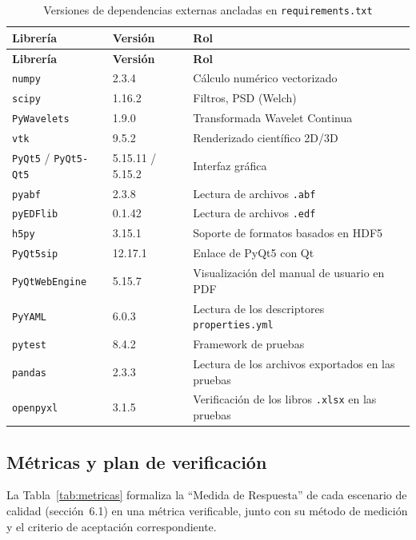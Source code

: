 \documentclass[11pt,a4paper]{article}
\DeclareRobustCommand{\_}{\textunderscore\allowbreak}
\begin{document}
\begin{center}
\small
\begin{longtable}{|p{}|p{}|p{}|}
\caption{Versiones de dependencias externas ancladas en \texttt{requirements.txt}} \label{tab:deps} \\
\hline
\textbf{Librer\'ia} & \textbf{Versi\'on} & \textbf{Rol} \\
\hline
\endfirsthead
\hline
\textbf{Librer\'ia} & \textbf{Versi\'on} & \textbf{Rol} \\
\hline
\endhead
\texttt{numpy} & 2.3.4 & C\'alculo num\'erico vectorizado \\
\hline
\texttt{scipy} & 1.16.2 & Filtros, PSD (Welch) \\
\hline
\texttt{PyWavelets} & 1.9.0 & Transformada Wavelet Continua \\
\hline
\texttt{vtk} & 9.5.2 & Renderizado cient\'ifico 2D/3D \\
\hline
\texttt{PyQt5} / \texttt{PyQt5-Qt5} & 5.15.11 / 5.15.2 & Interfaz gr\'afica \\
\hline
\texttt{pyabf} & 2.3.8 & Lectura de archivos \texttt{.abf} \\
\hline
\texttt{pyEDFlib} & 0.1.42 & Lectura de archivos \texttt{.edf} \\
\hline
\texttt{h5py} & 3.15.1 & Soporte de formatos basados en HDF5 \\
\hline
\texttt{PyQt5\_sip} & 12.17.1 & Enlace de PyQt5 con Qt \\
\hline
\texttt{PyQtWebEngine} & 5.15.7 & Visualización del manual de usuario en PDF \\
\hline
\texttt{PyYAML} & 6.0.3 & Lectura de los descriptores \texttt{properties.yml} \\
\hline
\texttt{pytest} & 8.4.2 & Framework de pruebas \\
\hline
\texttt{pandas} & 2.3.3 & Lectura de los archivos exportados en las pruebas \\
\hline
\texttt{openpyxl} & 3.1.5 & Verificación de los libros \texttt{.xlsx} en las pruebas \\
\hline
\end{longtable}
\end{center}

\subsection{M\'etricas y plan de verificaci\'on}
\label{sec:metricas_verificacion}

La Tabla~\ref{tab:metricas} formaliza la ``Medida de Respuesta'' de cada escenario de calidad (secci\'on~6.1) en una m\'etrica verificable, junto con su m\'etodo de medici\'on y el criterio de aceptaci\'on correspondiente.
\end{document}
